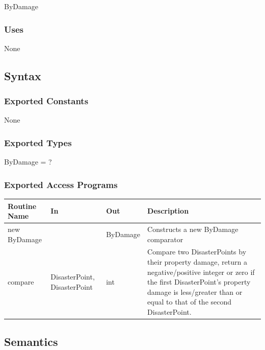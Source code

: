 \documentclass[12pt]{article}
\begin{document}
                ByDamage
                
                \subsubsection* {Uses}

                None

                \subsection* {Syntax}

                \subsubsection* {Exported Constants}

                None
                
                \subsubsection* {Exported Types}

                ByDamage = ?

                \subsubsection* {Exported Access Programs}
                
                \begin{tabular}{| l | l | l | p{5cm} |}
                \hline
                \textbf{Routine Name} & \textbf{In} & \textbf{Out} & \textbf{Description}\\
                \hline
                new ByDamage & & ByDamage & Constructs a new ByDamage comparator\\
                \hline
                compare & DisasterPoint, DisasterPoint & int & Compare two DisasterPoints by their property damage, return
                a negative/positive integer or zero if the first DisasterPoint's property damage is less/greater than
                or equal to that of the second DisasterPoint.\\
                \hline
                \end{tabular}
                
                \subsection*{Semantics}
\end{document}
